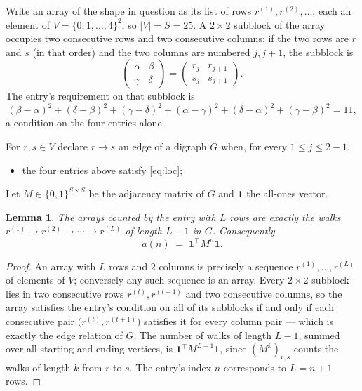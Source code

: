 \documentclass[11pt,a4paper]{article}
\theoremstyle{plain}
\newtheorem{lemma}[theorem]{Lemma}
\theoremstyle{definition}
\begin{document}
Write an array of the shape in question as its list of rows
$r^{(1)},r^{(2)},\dots$, each an element of
$V=\{0,1,\dots,4\}^{2}$, so $|V|=S=25$. A $2\times2$ subblock of the array
occupies two consecutive rows and two consecutive columns; if the two rows are $r$
and $s$ (in that order) and the two columns are numbered $j,j+1$,
the subblock is
\[
\begin{pmatrix}\alpha&\beta\\\gamma&\delta\end{pmatrix}=\begin{pmatrix}r_j&r_{j+1}\\s_j&s_{j+1}\end{pmatrix}.
\]
The entry's requirement on that subblock is
\begin{equation}\label{eq:loc}
(\beta-\alpha)^2+(\delta-\beta)^2+(\gamma-\delta)^2+(\alpha-\gamma)^2+(\delta-\alpha)^2+(\gamma-\beta)^2=11,
\end{equation}
a condition on the four entries alone.

For $r,s\in V$ declare $r\to s$ an edge of a digraph $G$ when, for every
$1\le j\le 2-1$,
\begin{itemize}
\item the four entries above satisfy \eqref{eq:loc};

\end{itemize}
Let $M\in\{0,1\}^{S\times S}$ be the adjacency matrix of $G$ and $\mathbf{1}$ the
all-ones vector.

\begin{lemma}\label{lem:walk}
The arrays counted by the entry with $L$ rows are exactly the walks
$r^{(1)}\to r^{(2)}\to\cdots\to r^{(L)}$ of length $L-1$ in $G$. Consequently
\[
a(n)\;=\;\mathbf{1}^{\!\top}M^{n}\mathbf{1} .
\]
\end{lemma}

\begin{proof}
An array with $L$ rows and $2$ columns is precisely a sequence
$r^{(1)},\dots,r^{(L)}$ of elements of $V$; conversely any such sequence is an array.
Every $2\times2$ subblock lies in two consecutive rows $r^{(t)},r^{(t+1)}$ and two
consecutive columns, so the array satisfies the entry's condition on all of its subblocks
if and only if each consecutive pair $\bigl(r^{(t)},r^{(t+1)}\bigr)$ satisfies it for
every column pair --- which is exactly the edge relation of $G$. The number of walks of
length $L-1$, summed over all starting and ending vertices, is
$\mathbf{1}^{\!\top}M^{L-1}\mathbf{1}$, since $(M^{k})_{r,s}$ counts the walks of
length $k$ from $r$ to $s$. The entry's index $n$ corresponds to $L=n+1$ rows.
\end{proof}
\end{document}
